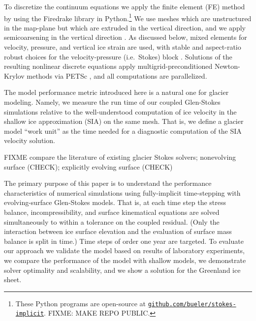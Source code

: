 \documentclass[letterpaper,final,12pt,reqno]{amsart}
\begin{document}
To discretize the continuum equations we apply the finite element (FE) method \cite{Elmanetal2014} by using the Firedrake library \cite{Rathgeberetal2016} in Python.\footnote{These Python programs are open-source at \href{https://github.com/bueler/stokes-implicit}{\texttt{github.com/bueler/stokes-implicit}}.  FIXME: MAKE REPO PUBLIC.}  We use meshes which are unstructured in the map-plane but which are extruded \cite{Gibsonetal2019} in the vertical direction, and we apply semicoarsening in the vertical direction \cite{Tuminaroetal2016}.  As discussed below, mixed elements for velocity, pressure, and vertical ice strain are used, with stable and aspect-ratio robust choices for the velocity-pressure (i.e.~Stokes) block \cite{Elmanetal2014}.  Solutions of the resulting nonlinear discrete equations apply multigrid-preconditioned Newton-Krylov methods \cite{Bueler2021} via PETSc \cite{Balayetal2020}, and all computations are parallelized.

The model performance metric introduced here is a natural one for glacier modeling.  Namely, we measure the run time of our coupled Glen-Stokes simulations relative to the well-understood computation of ice velocity in the shallow ice approximation (SIA) \cite{Fowler1997} on the same mesh.  That is, we define a glacier model ``work unit'' as the time needed for a diagnostic computation of the SIA velocity solution.

FIXME compare the literature of existing glacier Stokes solvers; nonevolving surface \cite{IsaacStadlerGhattas2015,Lengetal2013,Lengetal2014a,Tuminaroetal2016,Zwingeretal2007} (CHECK); explicitly evolving surface \cite{Gudmundsson1999,HelanowAhlkrona2018,Jouvetetal2008,Larouretal2012,
Lengetal2012,Lengetal2014b,LeysingerGudmundsson2004,PralongFunk2004,Seddiketal2012} (CHECK)

The primary purpose of this paper is to understand the performance characteristics of numerical simulations using fully-implicit time-stepping with evolving-surface Glen-Stokes models.  That is, at each time step the stress balance, incompressibility, and surface kinematical equations are solved simultaneously to within a tolerance on the coupled residual.  (Only the interaction between ice surface elevation and the evaluation of surface mass balance is split in time.)  Time steps of order one year are targeted.  To evaluate our approach we validate the model based on results of laboratory experiments, we compare the performance of the model with shallow models, we demonstrate solver optimality and scalability, and we show a solution for the Greenland ice sheet.
\end{document}
